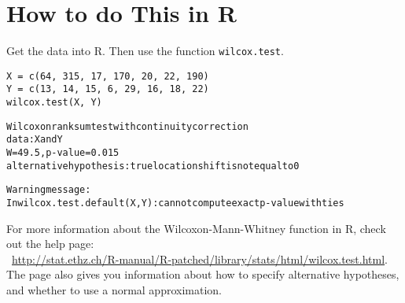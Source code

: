 \documentclass[12pt]{article}
\begin{document}
\section{How to do This in R}
Get the data into R. Then use the function \verb+wilcox.test+.
\begin{center}
\begin{lstlisting}
X = c(64, 315, 17, 170, 20, 22, 190)
Y = c(13, 14, 15, 6, 29, 16, 18, 22)
wilcox.test(X, Y)
\end{lstlisting}

\begin{alltt}
Wilcoxon rank sum test with continuity correction
data:  X and Y
W = 49.5, p-value = 0.015
alternative hypothesis: true location shift is not equal to 0

Warning message:
In wilcox.test.default(X, Y) : cannot compute exact p-value with ties
\end{alltt}
\end{center}
For more information about the Wilcoxon-Mann-Whitney function in R, check out the help page: \\\ \url{http://stat.ethz.ch/R-manual/R-patched/library/stats/html/wilcox.test.html}. \\
The page also gives you information about how to specify alternative hypotheses, and whether to use a normal approximation. 
\end{document}
